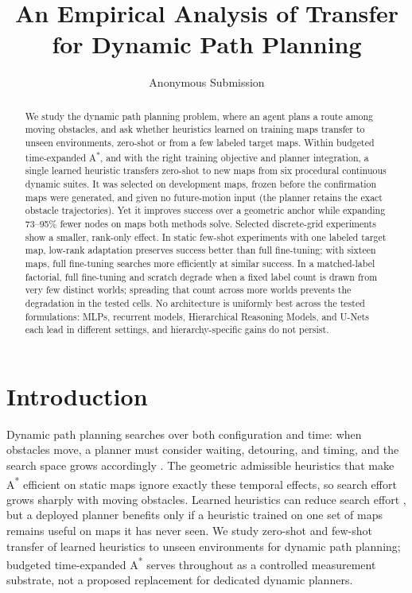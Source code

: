 \documentclass[letterpaper]{article} %
\title{An Empirical Analysis of Transfer for Dynamic Path Planning}
\author{
    Anonymous Submission
}
\begin{document}
\maketitle

\begin{abstract}
We study the dynamic path planning problem, where an agent plans a route among moving obstacles, and ask whether heuristics learned on training maps transfer to unseen environments, zero-shot or from a few labeled target maps. Within budgeted time-expanded A\textsuperscript{*}, and with the right training objective and planner integration, a single learned heuristic transfers zero-shot to new maps from six procedural continuous dynamic suites. It was selected on development maps, frozen before the confirmation maps were generated, and given no future-motion input (the planner retains the exact obstacle trajectories). Yet it improves success over a geometric anchor while expanding 73--95\% fewer nodes on maps both methods solve. Selected discrete-grid experiments show a smaller, rank-only effect. In static few-shot experiments with one labeled target map, low-rank adaptation preserves success better than full fine-tuning; with sixteen maps, full fine-tuning searches more efficiently at similar success. In a matched-label factorial, full fine-tuning and scratch degrade when a fixed label count is drawn from very few distinct worlds; spreading that count across more worlds prevents the degradation in the tested cells. No architecture is uniformly best across the tested formulations: MLPs, recurrent models, Hierarchical Reasoning Models, and U-Nets each lead in different settings, and hierarchy-specific gains do not persist.
\end{abstract}

\section{Introduction}

Dynamic path planning searches over both configuration and time: when obstacles move, a planner must consider waiting, detouring, and timing, and the search space grows accordingly \citep{silver2005cooperative,phillips2011sipp}. The geometric admissible heuristics that make A\textsuperscript{*} \citep{hart1968astar} efficient on static maps ignore exactly these temporal effects, so search effort grows sharply with moving obstacles. Learned heuristics can reduce search effort \citep{arfaee2011bootstrap,bhardwaj2017sail,yonetani2021neuralastar}, but a deployed planner benefits only if a heuristic trained on one set of maps remains useful on maps it has never seen. We study zero-shot and few-shot transfer of learned heuristics to unseen environments for dynamic path planning; budgeted time-expanded A\textsuperscript{*} serves throughout as a controlled measurement substrate, not a proposed replacement for dedicated dynamic planners.
\end{document}

